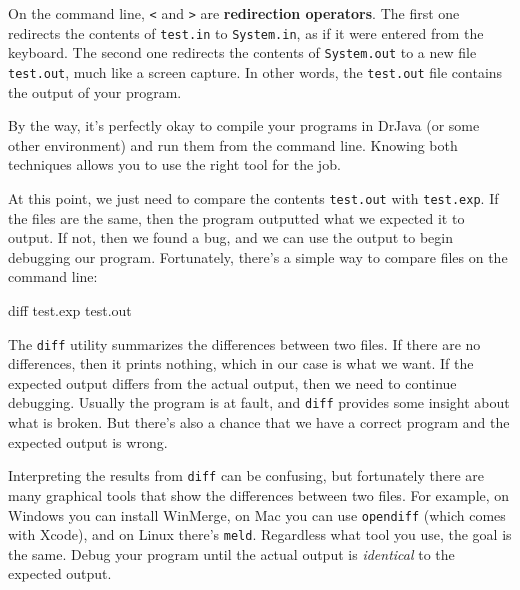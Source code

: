 \documentclass[12pt]{book}
\theoremstyle{exercise}
\newcommand{\java}[1]{\verb"#1"}
\newcommand{\java}[1]{\lstinline{#1}} %
\begin{document}

On the command line, {\tt <} and {\tt >} are {\bf redirection operators}.
The first one redirects the contents of {\tt test.in} to \java{System.in}, as if it were entered from the keyboard.
The second one redirects the contents of \java{System.out} to a new file {\tt test.out}, much like a screen capture.
In other words, the {\tt test.out} file contains the output of your program.



By the way, it's perfectly okay to compile your programs in DrJava (or some other environment) and run them from the command line.
Knowing both techniques allows you to use the right tool for the job.

At this point, we just need to compare the contents {\tt test.out} with {\tt test.exp}.
If the files are the same, then the program outputted what we expected it to output.
If not, then we found a bug, and we can use the output to begin debugging our program.
Fortunately, there's a simple way to compare files on the command line:

\begin{stdout}
diff test.exp test.out
\end{stdout}

The {\tt diff} utility summarizes the differences between two files.
If there are no differences, then it prints nothing, which in our case is what we want.
If the expected output differs from the actual output, then we need to continue debugging.
Usually the program is at fault, and {\tt diff} provides some insight about what is broken.
But there's also a chance that we have a correct program and the expected output is wrong.

Interpreting the results from {\tt diff} can be confusing, but fortunately there are many graphical tools that show the differences between two files.
For example, on Windows you can install WinMerge, on Mac you can use {\tt opendiff} (which comes with Xcode), and on Linux there's {\tt meld}.
Regardless what tool you use, the goal is the same.
Debug your program until the actual output is {\it identical} to the expected output.
\end{document}
